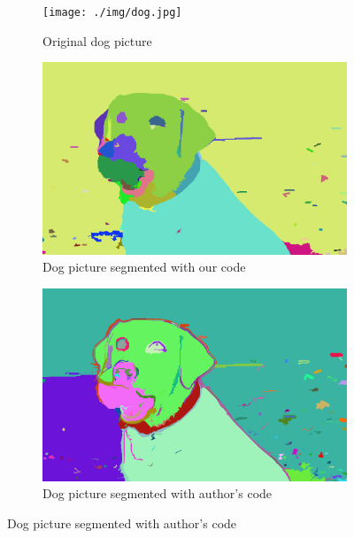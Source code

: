 \documentclass[12pt, english, titlepage]{article}
\begin{document}
\begin{figure}
        \centering
        \begin{subfigure}[b]{0.3\textwidth}
                \texttt{[image: ./img/dog.jpg]}
                \caption{Original dog picture}
                \label{ogdog}
        \end{subfigure}
        
        \begin{subfigure}[b]{0.3\textwidth}
                \includegraphics[width=\textwidth]{./img/our_dog.jpg}
                \caption{Dog picture segmented with our code}
                \label{ourdg}
        \end{subfigure}
        \begin{subfigure}[b]{0.3\textwidth}
                \includegraphics[width=\textwidth]{./img/their_dog.jpg}
                \caption{Dog picture segmented with author's code}
                \label{theirdg}
        \end{subfigure}
\end{figure}
\end{document}

